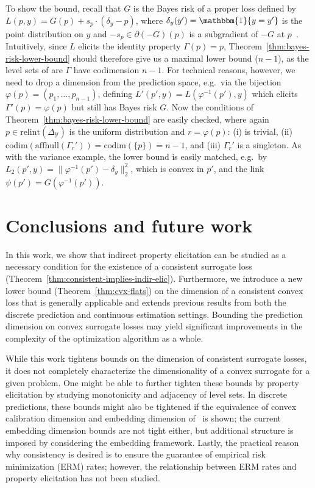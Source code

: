 \documentclass{article}
\newcommand{\simplex}{\Delta_\Y}
\newcommand{\relint}[1]{\mathrm{relint}(#1)}
\newcommand{\codim}{\mathrm{codim}}
\newcommand{\affhull}{\mathrm{affhull}}
\newcommand{\Y}{\mathcal{Y}}
\newcommand{\ones}{\mathbbm{1}}
\begin{document}
To show the bound, recall that $G$ is the Bayes risk of a proper loss defined by $L(p,y) = G(p) + s_p \cdot (\delta_y - p)$, where $\delta_y(y') = \ones\{y=y'\}$ is the point distribution on $y$ and $-s_p \in \partial (-G)(p)$ is a subgradient of $-G$ at $p$~\citep{gneiting2007strictly,reid2009surrogate,frongillo2014general}.
Intuitively, since $L$ elicits the identity property $\Gamma(p)=p$, Theorem~\ref{thm:bayes-risk-lower-bound} should therefore give us a maximal lower bound ($n-1$), as the level sets of are $\Gamma$ have codimension $n-1$.
For technical reasons, however, we need to drop a dimension from the prediction space, e.g.\ via the bijection $\varphi(p) = (p_1,\ldots,p_{n-1})$, defining $L'(p',y) = L(\varphi^{-1}(p'),y)$ which elicits $\Gamma'(p) = \varphi(p)$ but still has Bayes risk $G$.
Now the conditions of Theorem~\ref{thm:bayes-risk-lower-bound} are easily checked, where again $p\in\relint\simplex$ is the uniform distribution and $r=\varphi(p)$: (i) is trivial, (ii) $\codim(\affhull(\Gamma_r')) = \codim(\{p\}) = n-1$, and (iii) $\Gamma_r'$ is a singleton.
As with the variance example, the lower bound is easily matched, e.g.\ by $L_2(p',y) = \|\varphi^{-1}(p')-\delta_y\|_2^2$, which is convex in $p'$, and the link $\psi(p') = G(\varphi^{-1}(p'))$.


\section{Conclusions and future work}\label{sec:conclusions}
In this work, we show that indirect property elicitation can be studied as a necessary condition for the existence of a consistent surrogate loss (Theorem~\ref{thm:consistent-implies-indir-elic}).
Furthermore, we introduce a new lower bound (Theorem~\ref{thm:cvx-flats}) on the dimension of a consistent convex loss that is generally applicable and extends previous results from both the discrete prediction and continuous estimation settings.
Bounding the prediction dimension on convex surrogate losses may yield significant improvements in the complexity of the optimization algorithm as a whole.

While this work tightens bounds on the dimension of consistent surrogate losses, it does not completely characterize the dimensionality of a convex surrogate for a given problem.
One might be able to further tighten these bounds by property elicitation by studying monotonicity and adjacency of level sets.
In discrete predictions, these bounds might also be tightened if the equivalence of convex calibration dimension and embedding dimension of~\cite{finocchiaro2020embedding} is shown; the current embedding dimension bounds are not tight either, but additional structure is imposed by considering the embedding framework.
Lastly, the practical reason why consistency is desired is to ensure the guarantee of empirical risk minimization (ERM) rates; however, the relationship between ERM rates and property elicitation has not been studied.
\end{document}
